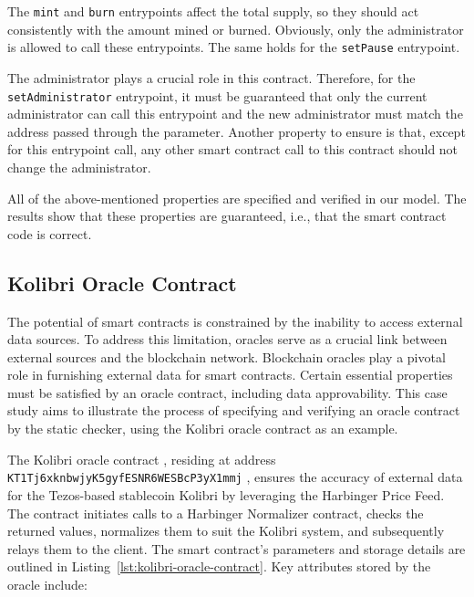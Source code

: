 \documentclass[a4paper,USenglish,cleveref, autoref, thm-restate]{lipics-v2021}
\begin{document}
The \lstinline/mint/ and \lstinline/burn/ entrypoints affect the total
supply, so they should act consistently with the amount mined or
burned. Obviously, only the administrator is allowed to call these
entrypoints. The same holds for the \lstinline/setPause/ entrypoint.

The administrator plays a crucial role in this contract. Therefore,
for the \lstinline/setAdministrator/ entrypoint, it must be guaranteed
that only the current administrator can call this entrypoint and the
new administrator must match the address passed through the
parameter. Another property to ensure is that, except for this
entrypoint call, any other smart contract call to this contract should
not change the administrator. 

All of the above-mentioned properties are specified and verified in
our model. The results show that these properties are guaranteed,
i.e., that the smart contract code is correct.

\subsection{Kolibri Oracle Contract}
\label{sec:kolibri-oracle-contr}
The potential of smart contracts is constrained by the inability to
access external data sources. To address this limitation, oracles
serve as a crucial link between external sources and the blockchain
network.  Blockchain oracles play a pivotal role in furnishing
external data for smart contracts. Certain essential properties must
be satisfied by an oracle contract, including data approvability. This
case study aims to illustrate the process of specifying and verifying
an oracle contract by the static checker, using the Kolibri oracle
contract as an example.


The Kolibri oracle contract \cite{kolibri},  residing at  address
\texttt{KT1Tj6xknbwjyK5gyfESNR6WESBcP3yX1mmj} \cite{tzstatskolibri}, ensures the accuracy of
external data for the Tezos-based stablecoin Kolibri by leveraging
the Harbinger Price Feed. The contract initiates calls to a Harbinger
Normalizer contract, checks the returned values, normalizes them to
suit the Kolibri system, and subsequently relays them to the
client. The smart contract's parameters and storage details are
outlined in Listing~\ref{lst:kolibri-oracle-contract}. Key attributes
stored by the oracle include:
\end{document}
